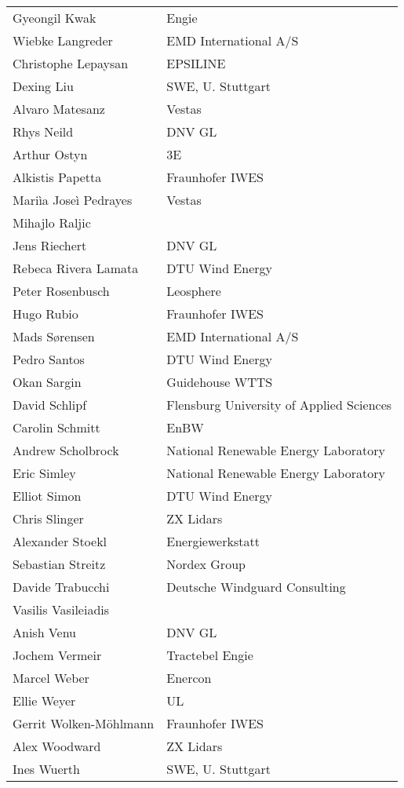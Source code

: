 \begin{supertabular}{@{}|p{0.45\columnwidth}|p{0.55\columnwidth}|@{}}
 Gyeongil Kwak & Engie \\
 Wiebke Langreder & EMD International A/S \\
 Christophe Lepaysan & EPSILINE \\
 Dexing Liu & SWE, U. Stuttgart \\
 Alvaro Matesanz & Vestas \\
 Rhys Neild & DNV GL \\
 Arthur Ostyn & 3E \\
 Alkistis Papetta & Fraunhofer IWES \\
 Mariìa Joseì Pedrayes & Vestas \\
 Mihajlo Raljic &  \\
 Jens Riechert & DNV GL \\
 Rebeca Rivera Lamata & DTU Wind Energy \\
 Peter Rosenbusch & Leosphere \\
 Hugo Rubio & Fraunhofer IWES \\
 Mads Sørensen & EMD International A/S \\
 Pedro Santos & DTU Wind Energy \\
 Okan Sargin & Guidehouse WTTS \\
 David Schlipf & Flensburg University of Applied Sciences \\
 Carolin Schmitt & EnBW \\
 Andrew Scholbrock & National Renewable Energy Laboratory \\
 Eric Simley & National Renewable Energy Laboratory \\
 Elliot Simon & DTU Wind Energy \\
 Chris Slinger & ZX Lidars \\
 Alexander Stoekl & Energiewerkstatt \\
 Sebastian Streitz & Nordex Group \\
 Davide Trabucchi & Deutsche Windguard Consulting \\
 Vasilis Vasileiadis & \\
 Anish Venu & DNV GL \\
 Jochem Vermeir & Tractebel Engie \\
 Marcel Weber & Enercon \\
 Ellie Weyer & UL \\
 Gerrit Wolken-Möhlmann & Fraunhofer IWES \\
 Alex Woodward & ZX Lidars \\
 Ines Wuerth & SWE, U. Stuttgart \\
\end{supertabular}
 